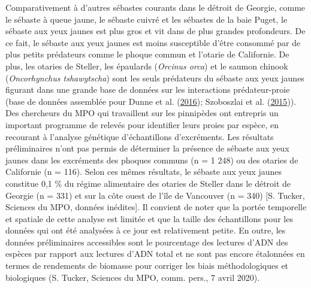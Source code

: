 \documentclass[french,11pt]{book}
\begin{document}
Comparativement à d'autres sébastes courants dans le détroit de Georgie, comme le sébaste à queue jaune, le sébaste cuivré et les sébastes de la baie Puget, le sébaste aux yeux jaunes est plus gros et vit dans de plus grandes profondeurs. De ce fait, le sébaste aux yeux jaunes est moins susceptible d'être consommé par de plus petits prédateurs comme le phoque commun et l'otarie de Californie. De plus, les otaries de Steller, les épaulards (\emph{Orcinus orca}) et le saumon chinook (\emph{Oncorhynchus tshawytscha}) sont les seuls prédateurs du sébaste aux yeux jaunes figurant dans une grande base de données sur les interactions prédateur-proie (base de données assemblée pour Dunne et al. (\protect\hyperlink{ref-dunne2016}{2016}); Szoboszlai et al. (\protect\hyperlink{ref-szoboszlai2015}{2015})). Des chercheurs du MPO qui travaillent sur les pinnipèdes ont entrepris un important programme de relevés pour identifier leurs proies par espèce, en recourant à l'analyse génétique d'échantillons d'excréments. Les résultats préliminaires n'ont pas permis de déterminer la présence de sébaste aux yeux jaunes dans les excréments des phoques communs (n = 1 248) ou des otaries de Californie (n = 116). Selon ces mêmes résultats, le sébaste aux yeux jaunes constitue 0,1 \% du régime alimentaire des otaries de Steller dans le détroit de Georgie (n = 331) et sur la côte ouest de l'île de Vancouver (n = 340) {[}S. Tucker, Sciences du MPO, données inédites{]}. Il convient de noter que la portée temporelle et spatiale de cette analyse est limitée et que la taille des échantillons pour les données qui ont été analysées à ce jour est relativement petite. En outre, les données préliminaires accessibles sont le pourcentage des lectures d'ADN des espèces par rapport aux lectures d'ADN total et ne sont pas encore étalonnées en termes de rendements de biomasse pour corriger les biais méthodologiques et biologiques (S. Tucker, Sciences du MPO, comm. pers., 7 avril 2020).
\end{document}
